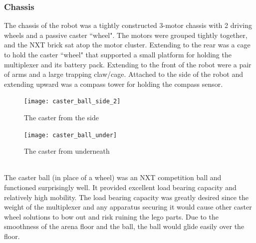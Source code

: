 \documentclass{article}
\begin{document}
\subsubsection{Chassis}
The chassis of the robot was a tightly constructed 3-motor chassis with 2 driving wheels and a passive caster ``wheel". The motors were grouped tightly together, and the NXT brick sat atop the motor cluster. Extending to the rear was a cage to hold the caster ``wheel" that supported a small platform for holding the multiplexer and its battery pack. Extending to the front of the robot were a pair of arms and a large trapping claw/cage. Attached to the side of the robot and extending upward was a compass tower for holding the compass sensor.

\begin{description}

  \begin{figure}[h!]
    \centering
    \begin{minipage}{.5\textwidth}
      \centering
      \texttt{[image: caster\_ball\_side\_2]}%
      \caption{The caster from the side}
      \label{fig:caster_ball_side}
    \end{minipage}%
    \begin{minipage}{.4\textwidth}
      \centering
      \texttt{[image: caster\_ball\_under]}
      \caption{The caster from underneath}
      \label{fig:caster_ball_under}
    \end{minipage}
  \end{figure}

  \item[Caster Ball] \hfill \\
  The caster ball (in place of a wheel) was an NXT competition ball and functioned surprisingly well. It provided excellent load bearing capacity and relatively high mobility. The load bearing capacity was greatly desired since the weight of the multiplexer and any apparatus securing it would cause other caster wheel solutions to bow out and risk ruining the lego parts. Due to the smoothness of the arena floor and the ball, the ball would glide easily over the floor.


\end{description}
\end{document}
